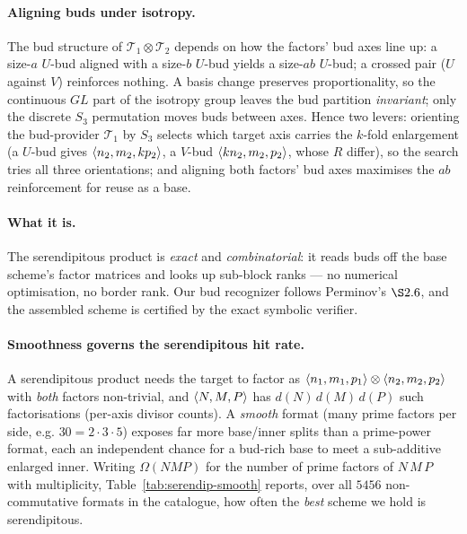 \paragraph{Aligning buds under isotropy.} The bud structure of
\(\mathcal{T}_1\otimes\mathcal{T}_2\) depends on how the factors' bud axes line up: a
size-\(a\) \(U\)-bud aligned with a size-\(b\) \(U\)-bud yields a size-\(ab\) \(U\)-bud; a
crossed pair (\(U\) against \(V\)) reinforces nothing. A basis change preserves
proportionality, so the continuous \(GL\) part of the isotropy group leaves the bud
partition \emph{invariant}; only the discrete \(S_3\) permutation moves buds between axes.
Hence two levers: orienting the bud-provider \(\mathcal{T}_1\) by \(S_3\) selects which
target axis carries the \(k\)-fold enlargement (a \(U\)-bud gives
\(\langle n_2, m_2, k p_2 \rangle\), a \(V\)-bud \(\langle k n_2, m_2, p_2 \rangle\), whose \(R\)
differ), so the search tries all three orientations; and aligning both factors' bud axes
maximises the \(ab\) reinforcement for reuse as a base.

\paragraph{What it is.} The serendipitous product is \emph{exact} and
\emph{combinatorial}: it reads buds off the base scheme's factor matrices and looks up
sub-block ranks --- no numerical optimisation, no border rank. Our bud recognizer follows
Perminov's \(\S 2.6\), and the assembled scheme is certified by the exact symbolic verifier.

\paragraph{Smoothness governs the serendipitous hit rate.} A serendipitous product needs
the target to factor as \(\langle n_1, m_1, p_1 \rangle\otimes\langle n_2, m_2, p_2 \rangle\) with
\emph{both} factors non-trivial, and \(\langle N, M, P \rangle\) has \(d(N)\,d(M)\,d(P)\) such
factorisations (per-axis divisor counts). A \emph{smooth} format (many prime factors per
side, e.g. \(30=2\cdot3\cdot5\)) exposes far more base/inner splits than a prime-power
format, each an independent chance for a bud-rich base to meet a sub-additive enlarged
inner. Writing \(\Omega(NMP)\) for the number of prime factors of \(N\,M\,P\) with
multiplicity, Table~\ref{tab:serendip-smooth} reports, over all \(5456\) non-commutative
formats in the catalogue, how often the \emph{best} scheme we hold is serendipitous.

